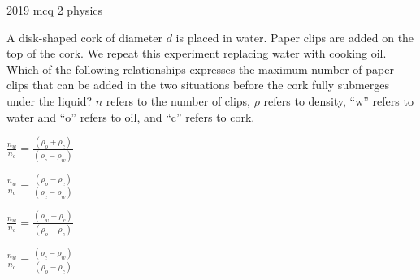 \ylDisplay
{}%
{2019}%
{mcq}%
{2}%
{physics}%
{}%
{
\ifStatement
A disk-shaped cork of diameter $d$ is placed in water. Paper clips are added on the top of the cork. We repeat this experiment replacing water with cooking oil. Which of the following relationships expresses the maximum number of paper clips that can be added in the two situations before the cork fully submerges under the liquid? $n$ refers to the number of clips, $\rho$ refers to density, ``w'' refers to water and ``o'' refers to oil, and ``c'' refers to cork.
\fi


$\frac{n_w}{n_o}=\frac{(\rho_o+\rho_c)}{(\rho_c-\rho_w)}$
\fi


$\frac{n_w}{n_o}=\frac{(\rho_o-\rho_c)}{(\rho_c-\rho_w)}$
\fi


$\frac{n_w}{n_o}=\frac{(\rho_w-\rho_c)}{(\rho_o-\rho_c)}$
\fi


$\frac{n_w}{n_o}=\frac{(\rho_c-\rho_w)}{(\rho_o-\rho_c)}$
\fi


\ifHint

\fi


\ifSolution

\fi


\ifEstStatement

\fi



\fi



\fi



\fi



\fi


\ifEstHint

\fi


\ifEstSolution

\fi
}
